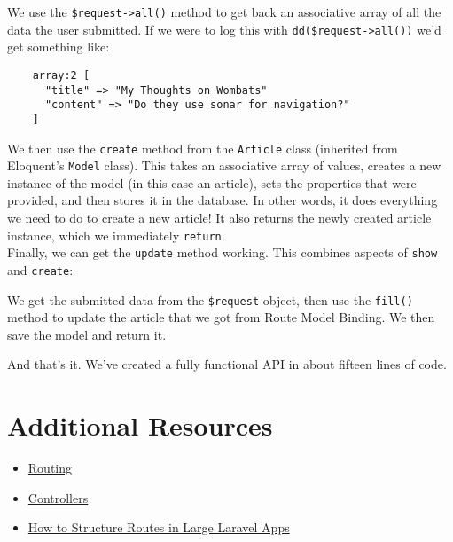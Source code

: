 We use the \texttt{\$request->all()} method to get back an associative array of all the data the user submitted. If we were to log this with \texttt{dd(\$request->all())} we'd get something like:

\begin{verbatim}
    array:2 [
      "title" => "My Thoughts on Wombats"
      "content" => "Do they use sonar for navigation?"
    ]
\end{verbatim}

We then use the \texttt{create} method from the \texttt{Article} class (inherited from Eloquent's \texttt{Model} class). This takes an associative array of values, creates a new instance of the model (in this case an article), sets the properties that were provided, and then stores it in the database. In other words, it does everything we need to do to create a new article! It also returns the newly created article instance, which we immediately \texttt{return}.
\\

Finally, we can get the \texttt{update} method working. This combines aspects of \texttt{show} and \texttt{create}:


We get the submitted data from the \texttt{\$request} object, then use the \texttt{fill()} method to update the article that we got from Route Model Binding. We then save the model and return it.

\hr

And that's it. We've created a fully functional API in about fifteen lines of code.


\section{Additional Resources}

\begin{itemize}[leftmargin=*]
    \item \href{https://laravel.com/docs/master/routing}{Routing}
    \item \href{http://laravel.com/docs/master/controllers}{Controllers}
    \item \href{https://laraveldaily.com/how-to-structure-routes-in-large-laravel-projects/}{How to Structure Routes in Large Laravel Apps}
\end{itemize}
